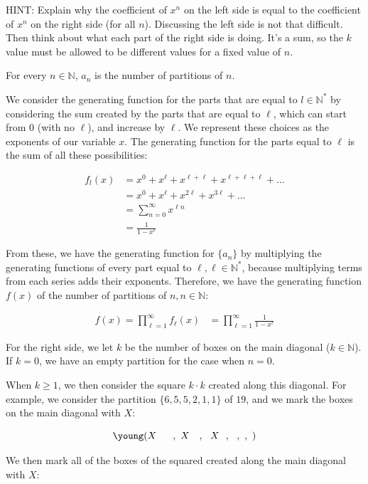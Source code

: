 \documentclass[10pt]{article}
\begin{document}
\begin{enumerate}
{\footnotesize HINT: Explain why the coefficient of $x^n$ on the left side is equal to the coefficient of $x^n$ on the right side (for all $n$). Discussing the left side is not that difficult. Then think about what each part of the right side is doing.  It's a sum, so the $k$ value must be allowed to be different values for a fixed value of $n$.}

For every $n \in \mathbb{N}$, $a_n$ is the number of partitions of $n$.

We consider the generating function for the parts that are equal to $l \in \mathbb{N}^*$ by considering the sum created by the parts that are equal to $\ell$, which can start from $0$ (with no $\ell$), and increase by $\ell$. We represent these choices as the exponents of our variable $x$. The generating function for the parts equal to $\ell$ is the sum of all these possibilities:

\begin{align*}
f_{l}(x) &= x^0+x^{\ell}+x^{\ell+\ell}+x^{\ell+\ell+\ell}+\ldots\\
    &= x^0+x^{\ell}+x^{2\ell}+x^{3\ell}+\ldots\\
    &= \sum\limits_{n=0}^\infty x^{\ell n}\\
    &= \frac{1}{1-x^\ell}
\end{align*}

From these, we have the generating function for $\{a_n\}$ by multiplying the generating functions of every part equal to $\ell, \ell \in \mathbb{N}^*$, because multiplying terms from each series adds their exponents. Therefore, we have the generating function $f(x)$ of the number of partitions of $n, n \in \mathbb{N}$: 

\begin{align*}
    f(x) = \prod\limits^{\infty}_{\ell=1} f_{\ell}(x)&= \prod\limits^{\infty}_{\ell=1} \frac{1}{1-x^\ell}
\end{align*}

For the right side, we let $k$ be the number of boxes on the main diagonal ($k \in \mathbb{N}$). If $k = 0$, we have an empty partition for the case when $n=0$.

When $k \geq 1$, we then consider the square $k \cdot k$ created along this diagonal. For example, we consider the partition $\{6,5,5,2,1,1\}$ of $19$, and we mark the boxes on the main diagonal with $X$:

$$\young(X~~~~~,~X~~~,~~X~~,~~,~,~)$$

We then mark all of the boxes of the squared created along the main diagonal with $X$:


\end{enumerate}
\end{document}
